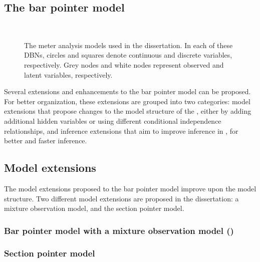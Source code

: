 \subsection{The bar pointer model}\label{sec:bpm:model}
\begin{figure}
\centering
     \hspace{1cm}
    \\
		 \hspace{0.5cm}
\caption[The meter analysis models used in the dissertation]{The meter analysis models used in the dissertation. In each of these \glspl{DBN}, circles and squares denote continuous and discrete variables, respectively. Grey nodes and white nodes represent observed and latent variables, respectively.}\label{fig:dbn:all}
\end{figure}
%

Several extensions and enhancements to the bar pointer model can be proposed. For better organization, these extensions are grouped into two categories: model extensions that propose changes to the model structure of the \bpmodel, either by adding additional hidden variables or using different conditional independence relationships, and inference extensions that aim to improve inference in \bpmodel, for better and faster inference. 
\subsection{Model extensions}\label{sec:bpm:modext}
The model extensions proposed to the bar pointer model improve upon the model structure. Two different model extensions are proposed in the dissertation: a mixture observation model, and the section pointer model. 
%
\subsubsection{Bar pointer model with a mixture observation model (\momodel)}\label{sec:mom:model}

%
\subsubsection{Section pointer model}\label{sec:spm:model}
%

%
